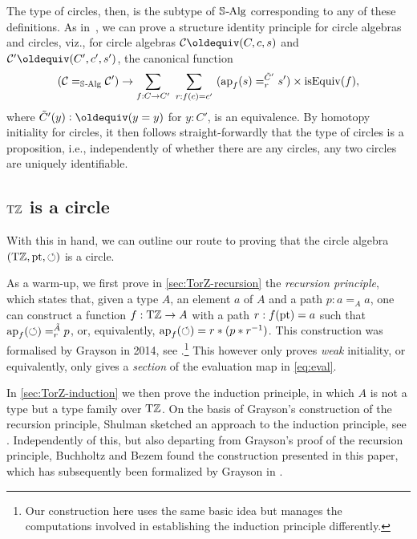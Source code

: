 \documentclass[a4paper,12pt]{amsart}
\begin{document}
The type of circles, then, is the subtype of $\mathord{\mathbb{S}\textup{\kern.5pt-\kern-.5pt}\mathrm{Alg}}$
corresponding to any of these definitions.
As in~\cite[Sec.~9.8]{hottbook},
we can prove a structure identity principle for circle algebras and circles,
viz., for circle algebras $\mathcal C\jdeq(C,c,s)$ and
$\mathcal C'\jdeq(C',c',s')$, the canonical function
\[
  (\mathcal C =_{\mathord{\mathbb{S}\textup{\kern.5pt-\kern-.5pt}\mathrm{Alg}}} \mathcal C')
  \to
  \sum_{f : C \to C'}~\sum_{r:f(c)=c'}~(\mathop{{\mathrm{ap}}_{f}}(s)=_r^{\tilde C'} s')
  \times \mathrm{isEquiv}(f),
\]
where $\tilde C'(y) \defeq (y=y)$ for $y:C'$,
is an equivalence.
By homotopy initiality for circles,
it then follows straight-forwardly that the type of circles
is a proposition, i.e.,
independently of whether there are any circles,
any two circles are uniquely identifiable.

\subsection{\texorpdfstring{${\mathrm{T}\mathbb{Z}}$}{TZ} is a circle}
\label{sec:TorZ-circle}

With this in hand, we can outline our route to proving
that the circle algebra $({\mathrm{T}\mathbb{Z}},{\mathord{\mathrm{pt}}},{\circlearrowleft})$ is a circle.

As a warm-up, we first prove in \cref{sec:TorZ-recursion}
the \emph{recursion principle},
which states that, given a type $A$, an element $a$ of $A$ and a
path $p:a=_A a$, one can construct a function $f:{\mathrm{T}\mathbb{Z}}\to A$
with a path $r:f({\mathord{\mathrm{pt}}})=a$ such that $\mathop{{\mathrm{ap}}_{f}}({\circlearrowleft})=^{\tilde A}_r p$,
or, equivalently, $\mathop{{\mathrm{ap}}_{f}}({\circlearrowleft}) = r * (p * r^{-1})$.
This construction was formalised by Grayson
in 2014, see \cite[\href{https://github.com/UniMath/UniMath/blob/master/UniMath/SyntheticHomotopyTheory/Circle.v}{Circle.v}]{UniMath}.\footnote{Our construction here uses the
same basic idea but manages the computations involved in establishing the
induction principle differently.}
This however only proves \emph{weak} initiality, or equivalently,
only gives a \emph{section} of the evaluation map in \eqref{eq:eval}.

In \cref{sec:TorZ-induction} we then prove the induction principle,
in which $A$ is not a type but a type family over ${\mathrm{T}\mathbb{Z}}$.
On the basis of Grayson's construction of the recursion principle,
Shulman sketched an approach to the induction principle, see \cite{circleind-Mike}.
Independently of this, but also departing from Grayson's proof of the
recursion principle, Buchholtz and Bezem found the construction
presented in this paper, which has subsequently been formalized
by Grayson \cite[\href{https://github.com/UniMath/UniMath/blob/d5e570/UniMath/SyntheticHomotopyTheory/Circle2.v\#L268}{Circle2.v, commit d5e570, line 268}]{UniMath} in \UniMath.
\end{document}
